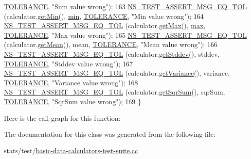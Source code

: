 \begin{DoxyCode}
      \hyperlink{basic-data-calculators-test-suite_8cc_a89311a98397f9d6967d2cb10d5152d77}{TOLERANCE}, \textcolor{stringliteral}{"Sum value wrong"});
163   \hyperlink{group__testing_ga9e7861b56b4e70db3b56044cb7a28e41}{NS\_TEST\_ASSERT\_MSG\_EQ\_TOL} (calculator.\hyperlink{classns3_1_1MinMaxAvgTotalCalculator_a6a506061da906ea3a1262a5f0394d68e}{getMin}(),      
      \hyperlink{80211b_8c_ac6afabdc09a49a433ee19d8a9486056d}{min},      \hyperlink{basic-data-calculators-test-suite_8cc_a89311a98397f9d6967d2cb10d5152d77}{TOLERANCE}, \textcolor{stringliteral}{"Min value wrong"});
164   \hyperlink{group__testing_ga9e7861b56b4e70db3b56044cb7a28e41}{NS\_TEST\_ASSERT\_MSG\_EQ\_TOL} (calculator.\hyperlink{classns3_1_1MinMaxAvgTotalCalculator_afb4430b9969e6acc05849bb9df444105}{getMax}(),      
      \hyperlink{80211b_8c_affe776513b24d84b39af8ab0930fef7f}{max},      \hyperlink{basic-data-calculators-test-suite_8cc_a89311a98397f9d6967d2cb10d5152d77}{TOLERANCE}, \textcolor{stringliteral}{"Max value wrong"});
165   \hyperlink{group__testing_ga9e7861b56b4e70db3b56044cb7a28e41}{NS\_TEST\_ASSERT\_MSG\_EQ\_TOL} (calculator.\hyperlink{classns3_1_1MinMaxAvgTotalCalculator_aba502282a75bae4c6f2f8f6fdc872cfe}{getMean}(),     mean,     
      \hyperlink{basic-data-calculators-test-suite_8cc_a89311a98397f9d6967d2cb10d5152d77}{TOLERANCE}, \textcolor{stringliteral}{"Mean value wrong"});
166   \hyperlink{group__testing_ga9e7861b56b4e70db3b56044cb7a28e41}{NS\_TEST\_ASSERT\_MSG\_EQ\_TOL} (calculator.\hyperlink{classns3_1_1MinMaxAvgTotalCalculator_a7dfbeb8a90ff11304b32df5f1b49482a}{getStddev}(),   stddev,   
      \hyperlink{basic-data-calculators-test-suite_8cc_a89311a98397f9d6967d2cb10d5152d77}{TOLERANCE}, \textcolor{stringliteral}{"Stddev value wrong"});
167   \hyperlink{group__testing_ga9e7861b56b4e70db3b56044cb7a28e41}{NS\_TEST\_ASSERT\_MSG\_EQ\_TOL} (calculator.\hyperlink{classns3_1_1MinMaxAvgTotalCalculator_a3dbf06a0a31cdab9dd780a6f263f6a55}{getVariance}(), variance, 
      \hyperlink{basic-data-calculators-test-suite_8cc_a89311a98397f9d6967d2cb10d5152d77}{TOLERANCE}, \textcolor{stringliteral}{"Variance value wrong"});
168   \hyperlink{group__testing_ga9e7861b56b4e70db3b56044cb7a28e41}{NS\_TEST\_ASSERT\_MSG\_EQ\_TOL} (calculator.\hyperlink{classns3_1_1MinMaxAvgTotalCalculator_a5f7ce191a74642f91590ede3c5c0315a}{getSqrSum}(),   sqrSum,   
      \hyperlink{basic-data-calculators-test-suite_8cc_a89311a98397f9d6967d2cb10d5152d77}{TOLERANCE}, \textcolor{stringliteral}{"SqrSum value wrong"});
169 \}
\end{DoxyCode}


Here is the call graph for this function\+:




The documentation for this class was generated from the following file\+:\begin{DoxyCompactItemize}
\item 
stats/test/\hyperlink{basic-data-calculators-test-suite_8cc}{basic-\/data-\/calculators-\/test-\/suite.\+cc}\end{DoxyCompactItemize}
